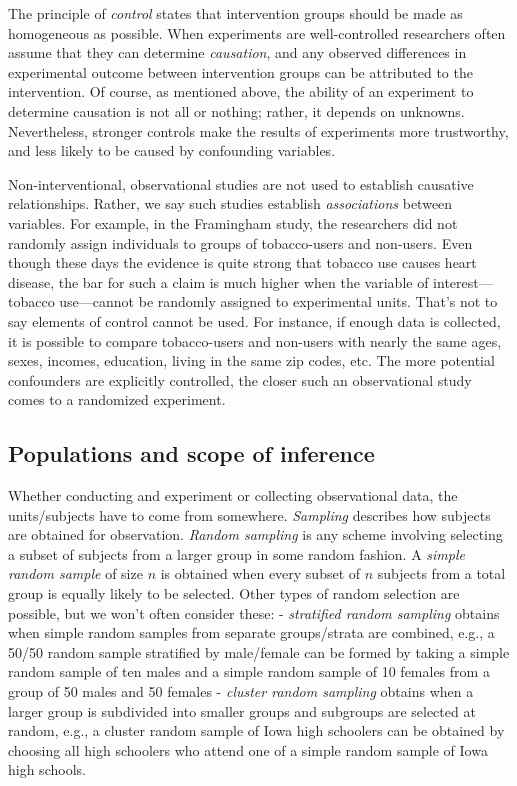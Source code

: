 \documentclass[]{book}
\begin{document}
The principle of \emph{control} states that intervention groups should
be made as homogeneous as possible. When experiments are well-controlled
researchers often assume that they can determine \emph{causation}, and
any observed differences in experimental outcome between intervention
groups can be attributed to the intervention. Of course, as mentioned
above, the ability of an experiment to determine causation is not all or
nothing; rather, it depends on unknowns. Nevertheless, stronger controls
make the results of experiments more trustworthy, and less likely to be
caused by confounding variables.

Non-interventional, observational studies are not used to establish
causative relationships. Rather, we say such studies establish
\emph{associations} between variables. For example, in the Framingham
study, the researchers did not randomly assign individuals to groups of
tobacco-users and non-users. Even though these days the evidence is
quite strong that tobacco use causes heart disease, the bar for such a
claim is much higher when the variable of interest---tobacco
use---cannot be randomly assigned to experimental units. That's not to
say elements of control cannot be used. For instance, if enough data is
collected, it is possible to compare tobacco-users and non-users with
nearly the same ages, sexes, incomes, education, living in the same zip
codes, etc. The more potential confounders are explicitly controlled,
the closer such an observational study comes to a randomized experiment.

\subsection{Populations and scope of
inference}\label{populations-and-scope-of-inference}

Whether conducting and experiment or collecting observational data, the
units/subjects have to come from somewhere. \emph{Sampling} describes
how subjects are obtained for observation. \emph{Random sampling} is any
scheme involving selecting a subset of subjects from a larger group in
some random fashion. A \emph{simple random sample} of size \(n\) is
obtained when every subset of \(n\) subjects from a total group is
equally likely to be selected. Other types of random selection are
possible, but we won't often consider these: - \emph{stratified random
sampling} obtains when simple random samples from separate groups/strata
are combined, e.g., a 50/50 random sample stratified by male/female can
be formed by taking a simple random sample of ten males and a simple
random sample of 10 females from a group of 50 males and 50 females -
\emph{cluster random sampling} obtains when a larger group is subdivided
into smaller groups and subgroups are selected at random, e.g., a
cluster random sample of Iowa high schoolers can be obtained by choosing
all high schoolers who attend one of a simple random sample of Iowa high
schools.
\end{document}
